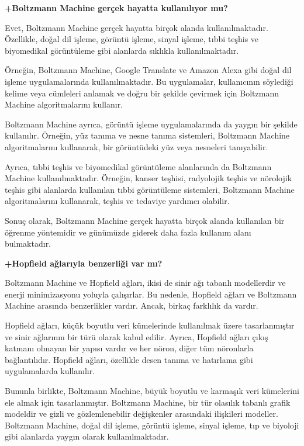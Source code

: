 \documentclass[11pt]{article}
\begin{document}
\textbf{+Boltzmann Machine gerçek hayatta kullanılıyor mu?}

Evet, Boltzmann Machine gerçek hayatta birçok alanda kullanılmaktadır. Özellikle, doğal dil işleme, görüntü işleme, sinyal işleme, tıbbi teşhis ve biyomedikal görüntüleme gibi alanlarda sıklıkla kullanılmaktadır.

Örneğin, Boltzmann Machine, Google Translate ve Amazon Alexa gibi doğal dil işleme uygulamalarında kullanılmaktadır. Bu uygulamalar, kullanıcının söylediği kelime veya cümleleri anlamak ve doğru bir şekilde çevirmek için Boltzmann Machine algoritmalarını kullanır.

Boltzmann Machine ayrıca, görüntü işleme uygulamalarında da yaygın bir şekilde kullanılır. Örneğin, yüz tanıma ve nesne tanıma sistemleri, Boltzmann Machine algoritmalarını kullanarak, bir görüntüdeki yüz veya nesneleri tanıyabilir.

Ayrıca, tıbbi teşhis ve biyomedikal görüntüleme alanlarında da Boltzmann Machine kullanılmaktadır. Örneğin, kanser teşhisi, radyolojik teşhis ve nörolojik teşhis gibi alanlarda kullanılan tıbbi görüntüleme sistemleri, Boltzmann Machine algoritmalarını kullanarak, teşhis ve tedaviye yardımcı olabilir.

Sonuç olarak, Boltzmann Machine gerçek hayatta birçok alanda kullanılan bir öğrenme yöntemidir ve günümüzde giderek daha fazla kullanım alanı bulmaktadır.


\textbf{+Hopfield ağlarıyla benzerliği var mı?}

Boltzmann Machine ve Hopfield ağları, ikisi de sinir ağı tabanlı modellerdir ve enerji minimizasyonu yoluyla çalışırlar. Bu nedenle, Hopfield ağları ve Boltzmann Machine arasında benzerlikler vardır. Ancak, birkaç farklılık da vardır.

Hopfield ağları, küçük boyutlu veri kümelerinde kullanılmak üzere tasarlanmıştır ve sinir ağlarının bir türü olarak kabul edilir. Ayrıca, Hopfield ağları çıkış katmanı olmayan bir yapısı vardır ve her nöron, diğer tüm nöronlarla bağlantılıdır. Hopfield ağları, özellikle desen tanıma ve hatırlama gibi uygulamalarda kullanılır.

Bununla birlikte, Boltzmann Machine, büyük boyutlu ve karmaşık veri kümelerini ele almak için tasarlanmıştır. Boltzmann Machine, bir tür olasılık tabanlı grafik modeldir ve gizli ve gözlemlenebilir değişkenler arasındaki ilişkileri modeller. Boltzmann Machine, doğal dil işleme, görüntü işleme, sinyal işleme, tıp ve biyoloji gibi alanlarda yaygın olarak kullanılmaktadır.
\end{document}
